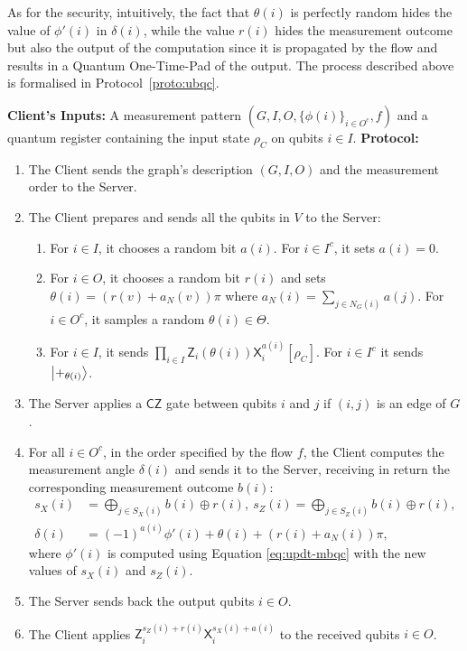 \documentclass[12pt]{iopart}
\newcommand{\cptp}[1]{\mathsf{#1}} \newcommand{\pd}[1]{\mathcal{#1}}  \newcommand{\sch}[1]{\bm{#1}}
\newcommand{\X}{\cptp{X}}
\newcommand{\Z}{\cptp{Z}}
\renewcommand{\1}{\mathds{1}}
\newcommand{\CZ}{\mathsf{CZ}}
\begin{document}
As for the security, intuitively, the fact that $\theta(i)$ is perfectly random hides the value of $\phi'(i)$ in $\delta(i)$, while the value $r(i)$ hides the measurement outcome but also the output of the computation since it is propagated by the flow and results in a Quantum One-Time-Pad of the output. The process described above is formalised in Protocol~\ref{proto:ubqc}.

\begin{protocol}[ht]
  \caption{UBQC Protocol}\label{proto:ubqc}
  \begin{algorithmic}[0]
    \STATE \textbf{Client's Inputs:} A measurement pattern $(G, I, O, \{\phi(i)\}_{i\in O^c}, f)$ and a quantum register containing the input state $\rho_C$ on qubits $i\in I$.
    \STATE \textbf{Protocol:}
    \begin{enumerate}
    \item The Client sends the graph's description $(G, I, O)$ and the measurement order to the Server.
    \item The Client prepares and sends all the qubits in $V$ to the Server:\footnotemark
      \begin{enumerate}
      \item For $i \in I$, it chooses a random bit $a(i)$. For $i \in I^c$, it sets $a(i) = 0$.
      \item For $i \in O$, it chooses a random bit $r(i)$ and sets $\theta(i) = (r(v) + a_N(v))\pi$ where $a_N(i) = \sum_{j \in N_G(i)} a(j)$. For $i \in O^c$, it samples a random $\theta(i) \in \Theta$.
      \item For $i \in I$, it sends $\prod_{i \in I}\Z_i(\theta(i))\X_i^{a(i)}[\rho_C]$. For $i \in I^c$ it sends $\ket{+_{\theta(i)}}$.
      \end{enumerate}
    \item The Server applies a $\CZ$ gate between qubits $i$ and $j$ if $(i,j)$ is an edge of $G$.
    \item For all $i \in O^c$, in the order specified by the flow $f$, the Client computes the measurement angle $\delta(i)$ and sends it to the Server, receiving in return the corresponding measurement outcome $b(i)$:
      \begin{align}
        s_X(i) & = \bigoplus_{j \in S_X(i)} b(i) \oplus r(i), \
        s_Z(i) = \bigoplus_{j \in S_Z(i)} b(i) \oplus r(i), \\
        \delta(i) & = (-1)^{a(i)}\phi'(i) + \theta(i) + (r(i) + a_N(i)) \pi,\label{eq:updt-ubqc}
      \end{align}
      where $\phi'(i)$ is computed using Equation \ref{eq:updt-mbqc} with the new values of $s_X(i)$ and $s_Z(i)$.
    \item The Server sends back the output qubits $i \in O$.
    \item The Client applies $\Z_i^{s_Z(i) + r(i)}\X_i^{s_X(i) + a(i)}$ to the received qubits $i \in O$.
    \end{enumerate}
  \end{algorithmic}
\end{protocol}
\end{document}
